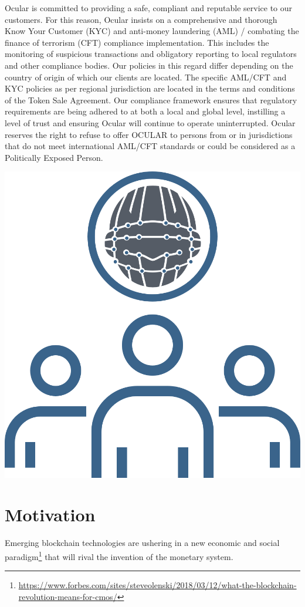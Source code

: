 \documentclass[a4paper]{article}
\begin{document}
Ocular is committed to providing a safe, compliant and reputable service to our customers. For this reason, Ocular insists on a comprehensive and thorough Know Your Customer (KYC) and anti-money laundering (AML) / combating the finance of terrorism (CFT) compliance implementation. This includes the monitoring of suspicious transactions and obligatory reporting to local regulators and other compliance bodies. Our policies in this regard differ depending on the country of origin of which our clients are located. The specific AML/CFT and KYC policies as per regional jurisdiction are located in the terms and conditions of the Token Sale Agreement. Our compliance framework ensures that regulatory requirements are being adhered to at both a local and global level, instilling a level of trust and ensuring Ocular will continue to operate uninterrupted. Ocular reserves the right to refuse to offer OCULAR to persons from or in jurisdictions that do not meet international AML/CFT standards or could be considered as a Politically Exposed Person.
\clearpage
\centerline{\includegraphics[width=1.0\textwidth]{ocular-kyc-aml}}

\section{Motivation}
Emerging blockchain technologies are ushering in a new economic and social paradigm\footnote{\url{https://www.forbes.com/sites/steveolenski/2018/03/12/what-the-blockchain-revolution-means-for-cmos/}} that will rival the invention of the monetary system. 
\end{document}
